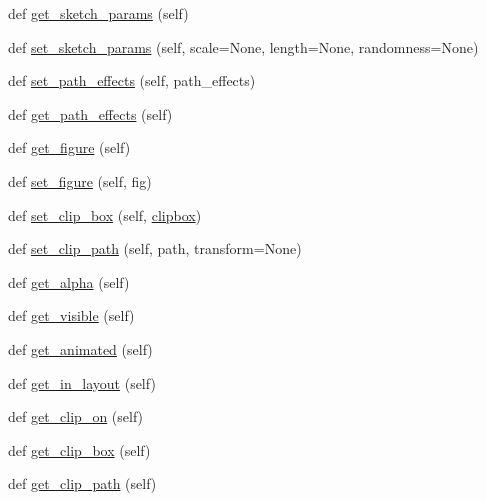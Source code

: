 \begin{DoxyCompactItemize}
\item 
def \hyperlink{classmatplotlib_1_1artist_1_1Artist_a73824b2b9468d747236484b747369e41}{get\+\_\+sketch\+\_\+params} (self)
\item 
def \hyperlink{classmatplotlib_1_1artist_1_1Artist_a0ba09d3b354380182d95585803a8042d}{set\+\_\+sketch\+\_\+params} (self, scale=None, length=None, randomness=None)
\item 
def \hyperlink{classmatplotlib_1_1artist_1_1Artist_a3493b4535ff9b0c4e94fa380b339ddca}{set\+\_\+path\+\_\+effects} (self, path\+\_\+effects)
\item 
def \hyperlink{classmatplotlib_1_1artist_1_1Artist_ac4f8d98b78bae2ab9596597e79009eb8}{get\+\_\+path\+\_\+effects} (self)
\item 
def \hyperlink{classmatplotlib_1_1artist_1_1Artist_abf1a21bbcccb778954e19d689ee35cc2}{get\+\_\+figure} (self)
\item 
def \hyperlink{classmatplotlib_1_1artist_1_1Artist_aadfe4032643c1684c4091a2fbca2f02b}{set\+\_\+figure} (self, fig)
\item 
def \hyperlink{classmatplotlib_1_1artist_1_1Artist_aaffb85c06ad99620859f82d48bd49e1d}{set\+\_\+clip\+\_\+box} (self, \hyperlink{classmatplotlib_1_1artist_1_1Artist_abb9739de2f1e228609a20dcbd53a731f}{clipbox})
\item 
def \hyperlink{classmatplotlib_1_1artist_1_1Artist_aa421287f2bcb337e0e14badacd4b5bcd}{set\+\_\+clip\+\_\+path} (self, path, transform=None)
\item 
def \hyperlink{classmatplotlib_1_1artist_1_1Artist_aeaaab64d370d42f0f442e926d70eae87}{get\+\_\+alpha} (self)
\item 
def \hyperlink{classmatplotlib_1_1artist_1_1Artist_a7de328b405c8c537b812bd20440abaf4}{get\+\_\+visible} (self)
\item 
def \hyperlink{classmatplotlib_1_1artist_1_1Artist_aec40b5ec5650b5640d91d41404b80707}{get\+\_\+animated} (self)
\item 
def \hyperlink{classmatplotlib_1_1artist_1_1Artist_ab3183de1b13f4a17e3f8f8d669602560}{get\+\_\+in\+\_\+layout} (self)
\item 
def \hyperlink{classmatplotlib_1_1artist_1_1Artist_a487bcc6b5aab2234abaa4930dffd7f39}{get\+\_\+clip\+\_\+on} (self)
\item 
def \hyperlink{classmatplotlib_1_1artist_1_1Artist_a4d44cc4e5c82eacc1abaa1d1478675c9}{get\+\_\+clip\+\_\+box} (self)
\item 
def \hyperlink{classmatplotlib_1_1artist_1_1Artist_ad0980d7769d0e1127da82470a8f421c3}{get\+\_\+clip\+\_\+path} (self)

\end{DoxyCompactItemize}
